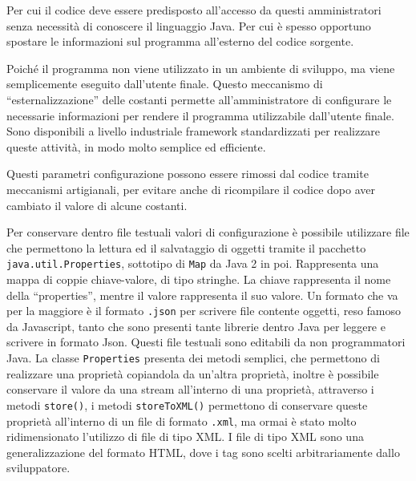 \documentclass{article}
\numberwithin{equation}{subsection}
\begin{document}
Per cui il codice deve essere predisposto all'accesso da questi amministratori senza necessità di conoscere il linguaggio Java. Per cui è spesso opportuno spostare le informazioni 
sul programma all'esterno del codice sorgente. 

Poiché il programma non viene utilizzato in un ambiente di sviluppo, ma viene semplicemente eseguito dall'utente finale. 
Questo meccanismo di ``esternalizzazione'' delle costanti permette all'amministratore di configurare le necessarie informazioni per rendere il programma utilizzabile dall'utente 
finale. 
Sono disponibili a livello industriale framework standardizzati per realizzare queste attività, in modo molto semplice ed efficiente. 

Questi parametri configurazione possono essere rimossi dal codice tramite meccanismi artigianali, per evitare anche di ricompilare il codice dopo aver cambiato il valore di 
alcune costanti. 


Per conservare dentro file testuali valori di configurazione è possibile utilizzare file che permettono la lettura ed il salvataggio di oggetti tramite il pacchetto \verb|java.util.Properties|, 
sottotipo di \verb|Map| da Java 2 in poi. Rappresenta una mappa di coppie chiave-valore, di tipo stringhe. La chiave rappresenta il nome della ``properties'', mentre il valore 
rappresenta il suo valore. 
Un formato che va per la maggiore è il formato \verb|.json| per scrivere file contente oggetti, reso famoso da Javascript, tanto che sono presenti tante librerie dentro 
Java per leggere e scrivere in formato Json. 
Questi file testuali sono editabili da non programmatori Java. 
La classe \verb|Properties| presenta dei metodi semplici, che permettono di realizzare una proprietà copiandola da un'altra proprietà, inoltre è possibile conservare il valore 
da una stream all'interno di una proprietà, attraverso i metodi \verb|store()|, i metodi \verb|storeToXML()| permettono di conservare queste proprietà all'interno di un file 
di formato \verb|.xml|, ma ormai è stato molto ridimensionato l'utilizzo di file di tipo XML. 
I file di tipo XML sono una generalizzazione del formato HTML, dove i tag sono scelti arbitrariamente dallo sviluppatore. 
\end{document}

